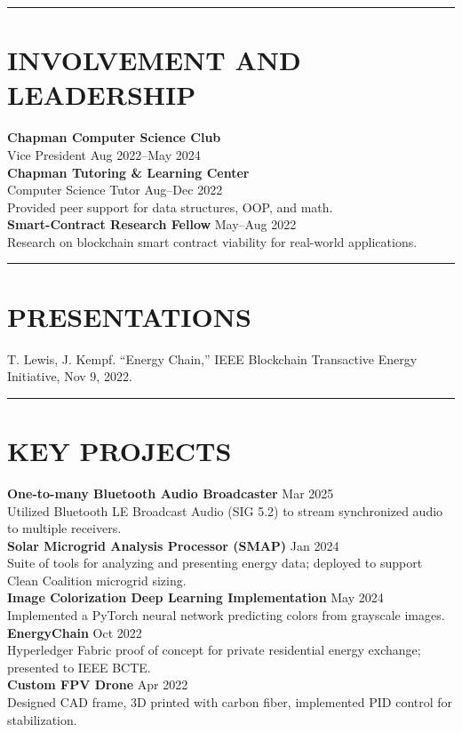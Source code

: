 \documentclass[a4paper,10pt]{article}
\begin{document}
\noindent\rule{\textwidth}{0.4pt}


\vspace{6pt}
\section*{INVOLVEMENT AND LEADERSHIP}
\textbf{Chapman Computer Science Club}\\
Vice President \hfill Aug 2022–May 2024\\
\textbf{Chapman Tutoring \& Learning Center}\\
Computer Science Tutor \hfill Aug–Dec 2022\\
Provided peer support for data structures, OOP, and math.\\[3pt]
\textbf{Smart-Contract Research Fellow} \hfill May–Aug 2022\\
Research on blockchain smart contract viability for real-world applications.

\noindent\rule{\textwidth}{0.4pt}

\section*{PRESENTATIONS}
T. Lewis, J. Kempf. “Energy Chain,” IEEE Blockchain Transactive Energy Initiative, Nov 9, 2022.\\

\noindent\rule{\textwidth}{0.4pt}

\section*{KEY PROJECTS}
\textbf{One-to-many Bluetooth Audio Broadcaster} \hfill Mar 2025\\
Utilized Bluetooth LE Broadcast Audio (SIG 5.2) to stream synchronized audio to multiple receivers.\\[3pt]
\textbf{Solar Microgrid Analysis Processor (SMAP)} \hfill Jan 2024\\
Suite of tools for analyzing and presenting energy data; deployed to support Clean Coalition microgrid sizing.\\[3pt]
\textbf{Image Colorization Deep Learning Implementation} \hfill May 2024\\
Implemented a PyTorch neural network predicting colors from grayscale images.\\[3pt]
\textbf{EnergyChain} \hfill Oct 2022\\
Hyperledger Fabric proof of concept for private residential energy exchange; presented to IEEE BCTE.\\[3pt]
\textbf{Custom FPV Drone} \hfill Apr 2022\\
Designed CAD frame, 3D printed with carbon fiber, implemented PID control for stabilization.
\end{document}
